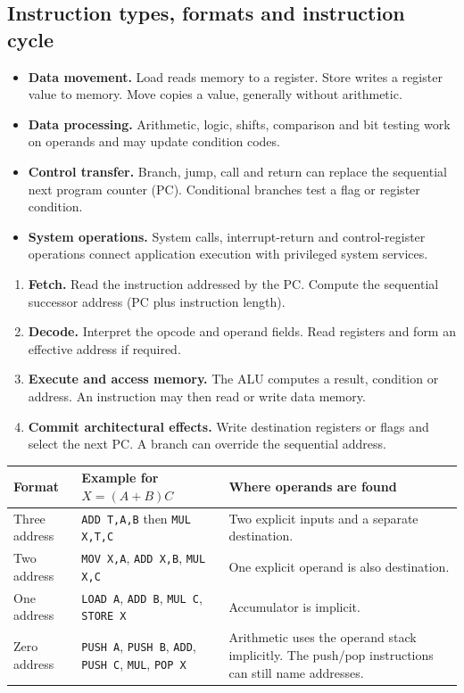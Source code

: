 \documentclass[12pt,a4paper]{article}
\begin{document}
\subsection{Instruction types, formats and instruction cycle}
\begin{itemize}[leftmargin=*,itemsep=3pt]
\item \textbf{Data movement.} Load reads memory to a register. Store writes a register value to memory. Move copies a value, generally without arithmetic.
\item \textbf{Data processing.} Arithmetic, logic, shifts, comparison and bit testing work on operands and may update condition codes.
\item \textbf{Control transfer.} Branch, jump, call and return can replace the sequential next program counter (PC). Conditional branches test a flag or register condition.
\item \textbf{System operations.} System calls, interrupt-return and control-register operations connect application execution with privileged system services.
\end{itemize}
\begin{enumerate}[leftmargin=*,itemsep=3pt]
\item \textbf{Fetch.} Read the instruction addressed by the PC. Compute the sequential successor address (PC plus instruction length).
\item \textbf{Decode.} Interpret the opcode and operand fields. Read registers and form an effective address if required.
\item \textbf{Execute and access memory.} The ALU computes a result, condition or address. An instruction may then read or write data memory.
\item \textbf{Commit architectural effects.} Write destination registers or flags and select the next PC. A branch can override the sequential address.
\end{enumerate}
\par\vspace{6pt}\noindent
\begin{tabularx}{\linewidth}{|B{2.35cm}|Y|Y|}\hline
Format & Example for $X=(A+B)C$ & Where operands are found \\ \hline
Three address & \texttt{ADD T,A,B} then \texttt{MUL X,T,C} & Two explicit inputs and a separate destination. \\ \hline
Two address & \texttt{MOV X,A}, \texttt{ADD X,B}, \texttt{MUL X,C} & One explicit operand is also destination. \\ \hline
One address & \texttt{LOAD A}, \texttt{ADD B}, \texttt{MUL C}, \texttt{STORE X} & Accumulator is implicit. \\ \hline
Zero address & \texttt{PUSH A}, \texttt{PUSH B}, \texttt{ADD}, \texttt{PUSH C}, \texttt{MUL}, \texttt{POP X} & Arithmetic uses the operand stack implicitly. The push/pop instructions can still name addresses. \\ \hline
\end{tabularx}
\end{document}
